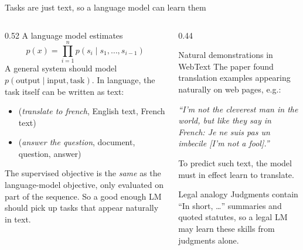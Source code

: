 \documentclass[aspectratio=169,11pt]{beamer}
\begin{document}
\begin{frame}{Tasks are just text, so a language model can learn them}
  \begin{columns}[T]
    \begin{column}{0.52\textwidth}
      \small
      A language model estimates
      \[
        p(x)=\prod_{i=1}^{n}p(s_i\mid s_1,\ldots,s_{i-1})
      \]
      A general system should model $p(\text{output}\mid\text{input},\text{task})$. In language, the task itself can be written as text:
      \begin{itemize}
        \item (\emph{translate to french}, English text, French text)
        \item (\emph{answer the question}, document, question, answer)
      \end{itemize}
      The supervised objective is the \emph{same} as the language-model objective, only evaluated on part of the sequence. So a good enough LM should pick up tasks that appear naturally in text.
    \end{column}
    \begin{column}{0.44\textwidth}
      \begin{exampleblock}{Natural demonstrations in WebText}
        \small
        The paper found translation examples appearing naturally on web pages, e.g.:
        \vspace{1mm}

        \emph{``I'm not the cleverest man in the world, but like they say in French: Je ne suis pas un imbecile [I'm not a fool].''}
        \vspace{1mm}

        To predict such text, the model must in effect learn to translate.
      \end{exampleblock}
      \begin{exampleblock}{Legal analogy}
        \small
        Judgments contain ``In short, \ldots'' summaries and quoted statutes, so a legal LM may learn these skills from judgments alone.
      \end{exampleblock}
    \end{column}
  \end{columns}
\end{frame}
\end{document}
